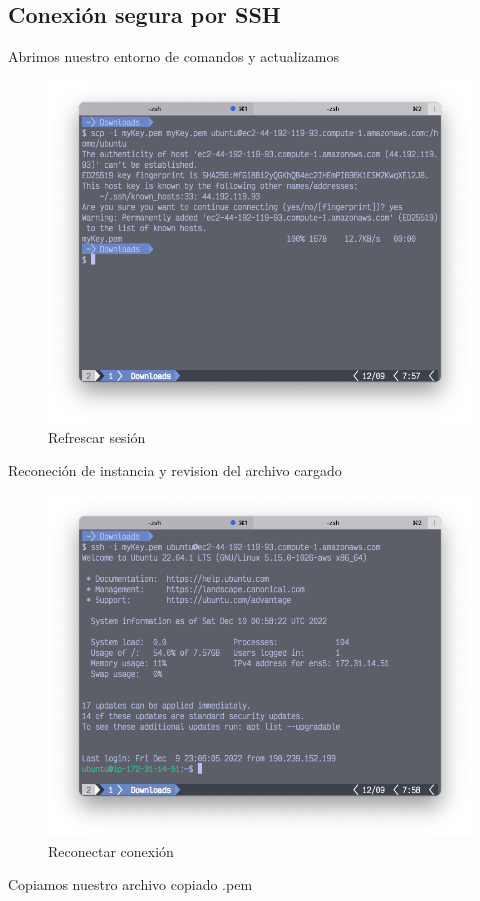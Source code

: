 \subsection{Conexión segura por SSH}
Abrimos nuestro entorno de comandos y actualizamos
 \clearpage
\begin{figure}[h]
	\centering
	\includegraphics[scale=.35] {img/27-scp-i}
	\caption{Refrescar sesión}
	\label{fig:27}	
\end{figure}
Reconeción de instancia y revision del archivo cargado
\begin{figure}[h]
	\centering
	\includegraphics[scale=.35] {img/28-reconect}
	\caption{Reconectar conexión}
	\label{fig:28}	
\end{figure}
Copiamos nuestro archivo copiado .pem
 \clearpage



